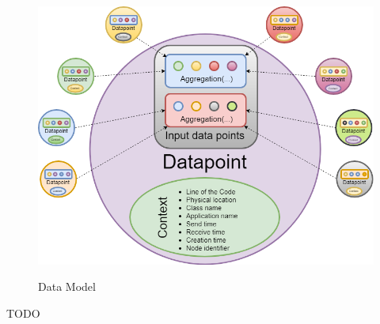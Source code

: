 \begin{itemize}
\begin{figure}[h]
\centering
\includegraphics[width=\linewidth]{figures/dataModelforIDP.png}\\
\caption{Data Model}
\label{dataModel}
\end{figure}
\end{itemize}
TODO